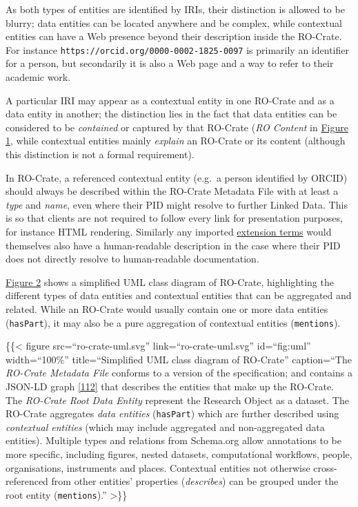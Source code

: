 {As both types of entities are identified by IRIs, their distinction is
allowed to be blurry; data entities can be located anywhere and be
complex, while contextual entities can have a Web presence beyond their
description inside the RO-Crate. For instance
\texttt{https://orcid.org/0000-0002-1825-0097} is primarily an
identifier for a person, but secondarily it is also a Web page and a way
to refer to their academic work.

A particular IRI may appear as a contextual entity in one RO-Crate and
as a data entity in another; the distinction lies in the fact that data
entities can be considered to be \emph{contained} or captured by that
RO-Crate (\emph{RO Content} in \protect\hyperlink{fig:conceptual}{Figure
1}, while contextual entities mainly \emph{explain} an RO-Crate or its
content (although this distinction is not a formal requirement).

In RO-Crate, a referenced contextual entity (e.g.~a person identified by
ORCID) should always be described within the RO-Crate Metadata File with
at least a \emph{type} and \emph{name}, even where their PID might
resolve to further Linked Data. This is so that clients are not required
to follow every link for presentation purposes, for instance HTML
rendering. Similarly any imported
\href{https://www.researchobject.org/ro-crate/1.1/appendix/jsonld.html\#extending-ro-crate}{extension
terms} would themselves also have a human-readable description in the
case where their PID does not directly resolve to human-readable
documentation.

\protect\hyperlink{fig:uml}{Figure 2} shows a simplified UML class
diagram of RO-Crate, highlighting the different types of data entities
and contextual entities that can be aggregated and related. While an
RO-Crate would usually contain one or more data entities
(\texttt{hasPart}), it may also be a pure aggregation of contextual
entities (\texttt{mentions}).

\{\{\textless{} figure src=``ro-crate-uml.svg''
link=``ro-crate-uml.svg'' id=``fig:uml'' width=``100\%''
title=``Simplified UML class diagram of RO-Crate'' caption=``The
\emph{RO-Crate Metadata File} conforms to a version of the
specification; and contains a JSON-LD graph
\href{https://www.w3.org/TR/2014/REC-json-ld-20140116/}{{[}112{]}} that
describes the entities that make up the RO-Crate. The \emph{RO-Crate
Root Data Entity} represent the Research Object as a dataset. The
RO-Crate aggregates \emph{data entities} (\texttt{hasPart}) which are
further described using \emph{contextual entities} (which may include
aggregated and non-aggregated data entities). Multiple types and
relations from Schema.org allow annotations to be more specific,
including figures, nested datasets, computational workflows, people,
organisations, instruments and places. Contextual entities not otherwise
cross-referenced from other entities' properties (\emph{describes}) can
be grouped under the root entity (\texttt{mentions}).'' \textgreater\}\}

}
